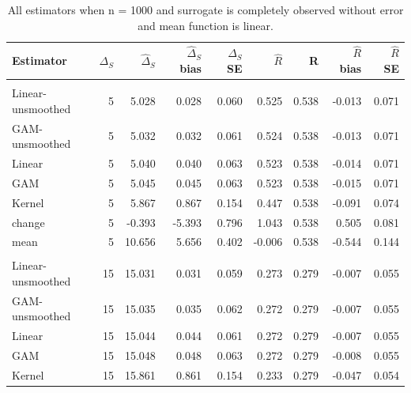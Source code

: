 \documentclass[useAMS,usenatbib,referee]{biom}
\begin{document}
\begin{table}[t]

\caption{\label{tab:oracle-large-n-lin}All estimators when n = 1000 and surrogate is completely observed without error and mean function is linear.}
\centering
\begin{tabular}{lrrrrrrrr}
\toprule
Estimator & $\Delta_S$ & $\widehat{\Delta}_S$ & $\widehat{\Delta}_S$ bias & $\widehat{\Delta}_S$ SE & $\widehat{R}$ & R & $\widehat{R}$ bias & $\widehat{R}$ SE\\
\midrule
\addlinespace[0.3em]
\multicolumn{9}{l}{\textbf{Small residual effect}}\\
\hspace{1em}Linear-unsmoothed & 5 & 5.028 & 0.028 & 0.060 & 0.525 & 0.538 & -0.013 & 0.071\\
\hspace{1em}GAM-unsmoothed & 5 & 5.032 & 0.032 & 0.061 & 0.524 & 0.538 & -0.013 & 0.071\\
\hspace{1em}Linear & 5 & 5.040 & 0.040 & 0.063 & 0.523 & 0.538 & -0.014 & 0.071\\
\hspace{1em}GAM & 5 & 5.045 & 0.045 & 0.063 & 0.523 & 0.538 & -0.015 & 0.071\\
\hspace{1em}Kernel & 5 & 5.867 & 0.867 & 0.154 & 0.447 & 0.538 & -0.091 & 0.074\\
\hspace{1em}change & 5 & -0.393 & -5.393 & 0.796 & 1.043 & 0.538 & 0.505 & 0.081\\
\hspace{1em}mean & 5 & 10.656 & 5.656 & 0.402 & -0.006 & 0.538 & -0.544 & 0.144\\
\addlinespace[0.3em]
\multicolumn{9}{l}{\textbf{Medium residual effect}}\\
\hspace{1em}Linear-unsmoothed & 15 & 15.031 & 0.031 & 0.059 & 0.273 & 0.279 & -0.007 & 0.055\\
\hspace{1em}GAM-unsmoothed & 15 & 15.035 & 0.035 & 0.062 & 0.272 & 0.279 & -0.007 & 0.055\\
\hspace{1em}Linear & 15 & 15.044 & 0.044 & 0.061 & 0.272 & 0.279 & -0.007 & 0.055\\
\hspace{1em}GAM & 15 & 15.048 & 0.048 & 0.063 & 0.272 & 0.279 & -0.008 & 0.055\\
\hspace{1em}Kernel & 15 & 15.861 & 0.861 & 0.154 & 0.233 & 0.279 & -0.047 & 0.054\\

\end{tabular}
\end{table}
\end{document}
